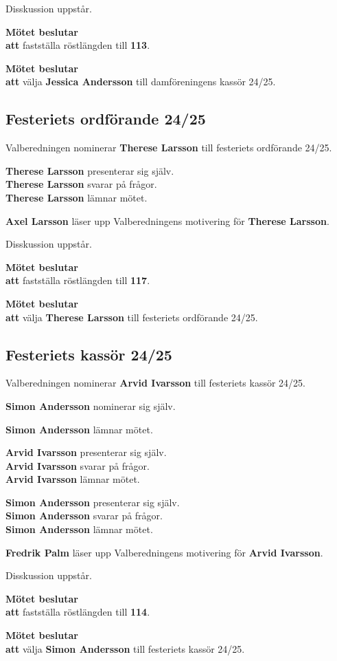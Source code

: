 \documentclass{datateknologsektionen-document}
\newcommand{\ind}{\hspace*{2em}}
\newcommand{\motetbeslutar}{\textbf{Mötet beslutar}}
\newcommand{\att}{\\\ind\textbf{att}}
\newcommand{\rostlangd}[1]{\motetbeslutar\att{} fastställa röstlängden till \textbf{#1}.}
\begin{document}
Disskussion uppstår.

\rostlangd{113}

\motetbeslutar\att{} välja \textbf{Jessica Andersson} till damföreningens kassör 24/25.

\subsection{Festeriets ordförande 24/25}

Valberedningen nominerar \textbf{Therese Larsson} till festeriets ordförande 24/25.

\textbf{Therese Larsson} presenterar sig själv.\\
\textbf{Therese Larsson} svarar på frågor.\\
\textbf{Therese Larsson} lämnar mötet.

\textbf{Axel Larsson} läser upp Valberedningens motivering för \textbf{Therese Larsson}.

Disskussion uppstår.

\rostlangd{117}

\motetbeslutar\att{} välja \textbf{Therese Larsson} till festeriets ordförande 24/25.

\subsection{Festeriets kassör 24/25}

Valberedningen nominerar \textbf{Arvid Ivarsson} till festeriets kassör 24/25.

\textbf{Simon Andersson} nominerar sig själv.

\textbf{Simon Andersson} lämnar mötet.

\textbf{Arvid Ivarsson} presenterar sig själv.\\
\textbf{Arvid Ivarsson} svarar på frågor.\\
\textbf{Arvid Ivarsson} lämnar mötet.

\textbf{Simon Andersson} presenterar sig själv.\\
\textbf{Simon Andersson} svarar på frågor.\\
\textbf{Simon Andersson} lämnar mötet.

\textbf{Fredrik Palm} läser upp Valberedningens motivering för \textbf{Arvid Ivarsson}.

Disskussion uppstår.

\rostlangd{114}

\motetbeslutar\att{} välja \textbf{Simon Andersson} till festeriets kassör 24/25.
\end{document}

